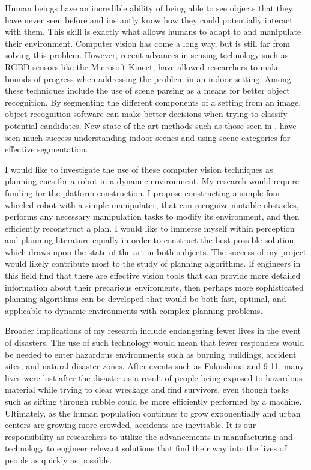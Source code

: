 \documentclass[10pt]{article}
\begin{document}
Human beings have an incredible ability of being able to see objects that they
have never seen before and instantly know how they could potentially interact
with them. This skill is exactly what allows humans to adapt to and manipulate
their environment. Computer vision has come a long way, but is still far from
solving this problem. However, recent advances in sensing technology such as
RGBD sensors like the Microsoft Kinect, have allowed researchers to make bounds
of progress when addressing the problem in an indoor setting. Among these
techniques include the use of scene parsing as a means for better object
recognition. By segmenting the different components of a setting from an image,
object recognition software can make better decisions when trying to classify
potential candidates. New state of the art methods such as those seen in
\cite{gupta}, have seen much success understanding indoor scenes and using
scene categories for effective segmentation.

I would like to investigate the use of these computer vision techniques as
planning cues for a robot in a dynamic environment. My research would require
funding for the platform construction. I propose constructing a simple four
wheeled robot with a simple manipulater, that can recognize mutable obstacles,
performs any necessary manipulation tasks to modify its environment, and then
efficiently reconstruct a plan. I would like to immerse myself within
perception and planning literature equally in order to construct the best
possible solution, which draws upon the state of the art in both subjects. The
success of my project would likely contribute most to the study of planning
algorithms. If engineers in this field find that there are effective vision
tools that can provide more detailed information about their precarious
enviroments, then perhaps more sophisticated planning algorithms can be
developed that would be both fast, optimal, and applicable to dynamic
environments with complex planning problems.

Broader implications of my research include endangering fewer lives in the
event of disasters. The use of such technology would mean that fewer responders
would be needed to enter hazardous environments such as burning buildings,
accident sites, and natural disaster zones. After events such as Fukushima and
9-11, many lives were lost after the disaster as a result of people being
exposed to hazardous material while trying to clear wreckage and find
survivors, even though tasks such as sifting through rubble could be more
efficiently performed by a machine. Ultimately, as the human population
continues to grow exponentially and urban centers are growing more crowded,
accidents are inevitable.  It is our responsibility as researchers to utilize
the advancements in manufacturing and technology to engineer relevant solutions
that find their way into the lives of people as quickly as possible.
\end{document}
